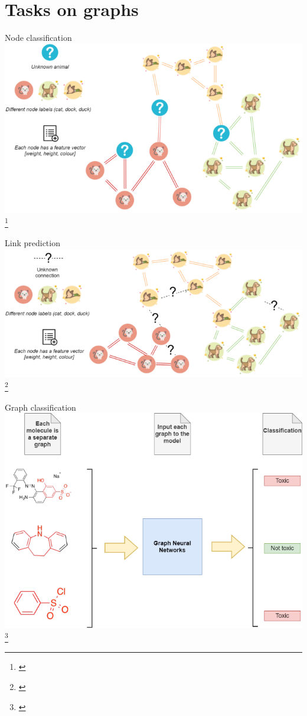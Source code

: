\documentclass[10pt]{beamer}
\begin{document}
\section{Tasks on graphs}

\begin{frame}{Node classification}
	\centering
	\includegraphics[width=0.7\pagewidth]{images/node-classification.png}\footnote{\cite{kubara_machine_2020}}
\end{frame}

\begin{frame}{Link prediction}
	\centering
	\includegraphics[width=0.7\pagewidth]{images/link-prediction.png}\footnote{\cite{kubara_machine_2020}}
\end{frame}

\begin{frame}{Graph classification}
	\centering
	\includegraphics[width=0.7\pagewidth]{images/whole-graph-learning.png}\footnote{\cite{kubara_machine_2020}}
\end{frame}
\end{document}
